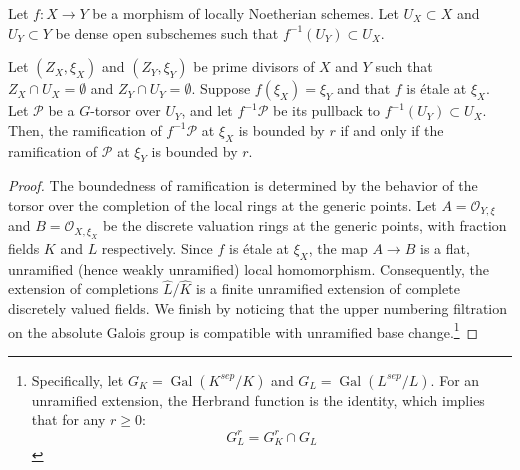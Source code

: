 \begin{lemma}\label{lemma:descend_ramification_along_etale:reorg}

Let $f: X \to Y$ be a morphism of locally Noetherian schemes. Let $U_X \subset X$ and $U_Y \subset Y$ be dense open subschemes such that $f^{-1}(U_Y) \subset U_X$. 

Let $(Z_X, \xi_X)$ and $(Z_Y, \xi_Y)$ be prime divisors of $X$ and $Y$ such that $Z_X \cap U_X = \emptyset$ and $Z_Y \cap U_Y = \emptyset$. 
Suppose $f(\xi_X) = \xi_Y$ and that $f$ is étale at $\xi_X$.
Let $\mathcal{P}$ be a $G$-torsor over $U_Y$, and let $f^{-1} \mathcal{P}$ be its pullback to $f^{-1}(U_Y) \subset U_X$. 
Then, the ramification of $f^{-1} \mathcal{P}$ at $\xi_X$ is bounded by $r$ if and only if the ramification of $\mathcal{P}$ at $\xi_Y$ is bounded by $r$.
\end{lemma}
\begin{proof}
The boundedness of ramification is determined by the behavior of the torsor over the completion of the local rings at the generic points. 
Let $A = \mathcal{O}_{Y, \xi}$ and $B = \mathcal{O}_{X, \xi_X}$ be the discrete valuation rings at the generic points, with fraction fields 
$K$ and $L$ respectively. Since $f$ is étale at $\xi_X$, the map $A \to B$ is a flat, unramified (hence weakly unramified) local homomorphism. 
Consequently, the extension of completions $\widehat{L} / \widehat{K}$ is a finite unramified extension of complete discretely valued fields.
We finish by noticing that the upper numbering filtration on the absolute Galois group is compatible with unramified base change.\footnote{
 Specifically, let $G_K = \operatorname{Gal}(K^{sep}/K)$ and $G_L = \operatorname{Gal}(L^{sep}/L)$. For an unramified extension, the Herbrand function is the identity, which implies that for any $r \geq 0$:
\[ G_L^r = G_K^r \cap G_L \]}
\end{proof}


